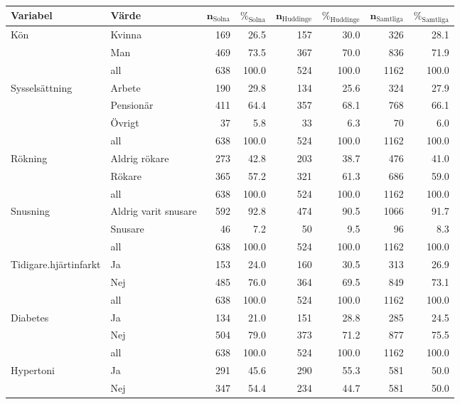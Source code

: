 \begin{table}[htbp]
\centering
\caption{} 
\label{}
{\footnotesize
\begin{tabular}{ll|rr|rr|rr}
 \textbf{Variabel} & \textbf{Värde} & $\mathbf{n_{\mathrm{Solna}}}$ & $\mathbf{\%_{\mathrm{Solna}}}$ & $\mathbf{n_{\mathrm{Huddinge}}}$ & $\mathbf{\%_{\mathrm{Huddinge}}}$ & $\mathbf{n_{\mathrm{Samtliga}}}$ & $\mathbf{\%_{\mathrm{Samtliga}}}$ \\ 
  \hline
Kön & Kvinna & 169 & 26.5 & 157 & 30.0 & 326 & 28.1 \\ 
   & Man & 469 & 73.5 & 367 & 70.0 & 836 & 71.9 \\ 
   \hline
 & all & 638 & 100.0 & 524 & 100.0 & 1162 & 100.0 \\ 
   \hline
\hline
Sysselsättning & Arbete & 190 & 29.8 & 134 & 25.6 & 324 & 27.9 \\ 
   & Pensionär & 411 & 64.4 & 357 & 68.1 & 768 & 66.1 \\ 
   & Övrigt & 37 & 5.8 & 33 & 6.3 & 70 & 6.0 \\ 
   \hline
 & all & 638 & 100.0 & 524 & 100.0 & 1162 & 100.0 \\ 
   \hline
\hline
Rökning & Aldrig rökare & 273 & 42.8 & 203 & 38.7 & 476 & 41.0 \\ 
   & Rökare & 365 & 57.2 & 321 & 61.3 & 686 & 59.0 \\ 
   \hline
 & all & 638 & 100.0 & 524 & 100.0 & 1162 & 100.0 \\ 
   \hline
\hline
Snusning & Aldrig varit snusare & 592 & 92.8 & 474 & 90.5 & 1066 & 91.7 \\ 
   & Snusare & 46 & 7.2 & 50 & 9.5 & 96 & 8.3 \\ 
   \hline
 & all & 638 & 100.0 & 524 & 100.0 & 1162 & 100.0 \\ 
   \hline
\hline
Tidigare.hjärtinfarkt & Ja & 153 & 24.0 & 160 & 30.5 & 313 & 26.9 \\ 
   & Nej & 485 & 76.0 & 364 & 69.5 & 849 & 73.1 \\ 
   \hline
 & all & 638 & 100.0 & 524 & 100.0 & 1162 & 100.0 \\ 
   \hline
\hline
Diabetes & Ja & 134 & 21.0 & 151 & 28.8 & 285 & 24.5 \\ 
   & Nej & 504 & 79.0 & 373 & 71.2 & 877 & 75.5 \\ 
   \hline
 & all & 638 & 100.0 & 524 & 100.0 & 1162 & 100.0 \\ 
   \hline
\hline
Hypertoni & Ja & 291 & 45.6 & 290 & 55.3 & 581 & 50.0 \\ 
   & Nej & 347 & 54.4 & 234 & 44.7 & 581 & 50.0 \\ 

\end{tabular}}
\end{table}
